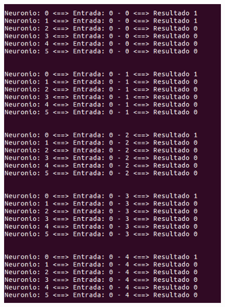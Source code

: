 \documentclass[hidelinks,12pt]{article}
\begin{document}
		\begin{figure}[!h]
			\centering
			\includegraphics[scale=0.5]{Figures/E3S0P1.png}
		\end{figure}
		
\end{document}
